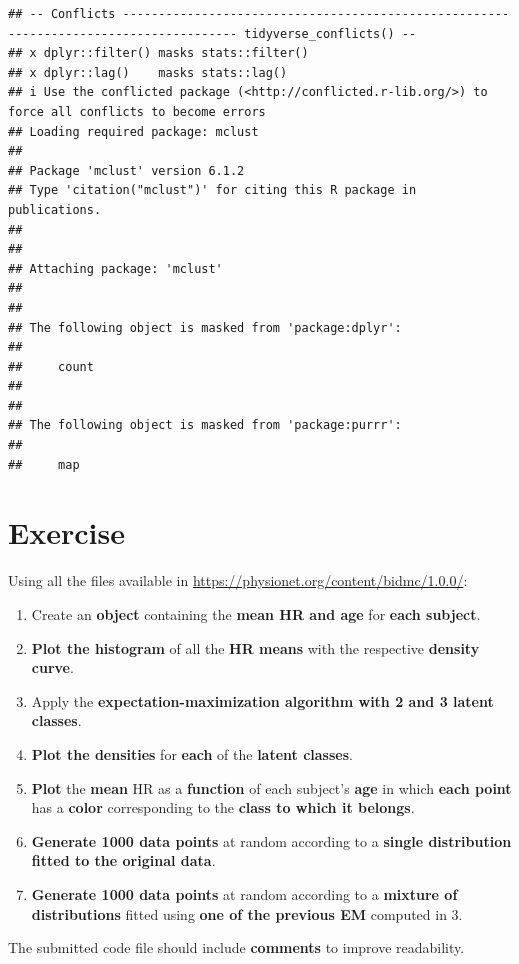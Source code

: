\documentclass[
]{article}
\providecommand{\tightlist}{%
  \setlength{\itemsep}{0pt}\setlength{\parskip}{0pt}}
\begin{document}
\begin{verbatim}
## -- Conflicts -------------------------------------------------------------------------------------- tidyverse_conflicts() --
## x dplyr::filter() masks stats::filter()
## x dplyr::lag()    masks stats::lag()
## i Use the conflicted package (<http://conflicted.r-lib.org/>) to force all conflicts to become errors
## Loading required package: mclust
## 
## Package 'mclust' version 6.1.2
## Type 'citation("mclust")' for citing this R package in publications.
## 
## 
## Attaching package: 'mclust'
## 
## 
## The following object is masked from 'package:dplyr':
## 
##     count
## 
## 
## The following object is masked from 'package:purrr':
## 
##     map
\end{verbatim}

\section{Exercise}\label{exercise}

Using all the files available in
\url{https://physionet.org/content/bidmc/1.0.0/}:

\begin{enumerate}
\def\labelenumi{\arabic{enumi}.}
\tightlist
\item
  Create an \textbf{object} containing the \textbf{mean HR and age} for
  \textbf{each subject}.
\item
  \textbf{Plot the histogram} of all the \textbf{HR means} with the
  respective \textbf{density curve}.
\item
  Apply the \textbf{expectation-maximization algorithm with 2 and 3
  latent classes}.
\item
  \textbf{Plot the densities} for \textbf{each} of the \textbf{latent
  classes}.
\item
  \textbf{Plot} the \textbf{mean} HR as a \textbf{function} of each
  subject's \textbf{age} in which \textbf{each point} has a
  \textbf{color} corresponding to the \textbf{class to which it
  belongs}.
\item
  \textbf{Generate 1000 data points} at random according to a
  \textbf{single distribution fitted to the original data}.
\item
  \textbf{Generate 1000 data points} at random according to a
  \textbf{mixture of distributions} fitted using \textbf{one of the
  previous EM} computed in 3.
\end{enumerate}

The submitted code file should include \textbf{comments} to improve
readability.
\end{document}
